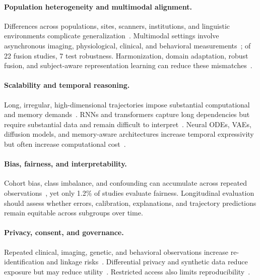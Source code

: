 \documentclass[11pt]{article}
\theoremstyle{plain}
\theoremstyle{definition}
\theoremstyle{remark}
\begin{document}
\paragraph{Population heterogeneity and multimodal alignment.} Differences across populations, sites, scanners, institutions, and linguistic environments complicate generalization~\cite{10483639,10635830,tsakalidis-etal-2022-identifying,matero-etal-2024-using}. Multimodal settings involve asynchronous imaging, physiological, clinical, and behavioral measurements~\cite{10337299,9874547,9313310,10809027,10822368,10821737}; of 22 fusion studies, 7 test robustness. Harmonization, domain adaptation, robust fusion, and subject-aware representation learning can reduce these mismatches~\cite{10385940,10890535,9711166,tseriotou-etal-2024-sig,serra-etal-2023-controllable}.
\paragraph{Scalability and temporal reasoning.} Long, irregular, high-dimensional trajectories impose substantial computational and memory demands~\cite{tsakalidis-etal-2022-identifying,hills-etal-2023-creation}. RNNs and transformers capture long dependencies but require substantial data and remain difficult to interpret~\cite{8834556,8857827,10483639}. Neural ODEs, VAEs, diffusion models, and memory-aware architectures increase temporal expressivity but often increase computational cost~\cite{9761588,10635519,10635663,9669504,8885357,9983643,8730775}.
\paragraph{Bias, fairness, and interpretability.} Cohort bias, class imbalance, and confounding can accumulate across repeated observations~\cite{10483639,10340079,9629798,9313227}, yet only 1.2\% of studies evaluate fairness. Longitudinal evaluation should assess whether errors, calibration, explanations, and trajectory predictions remain equitable across subgroups over time.
\paragraph{Privacy, consent, and governance.} Repeated clinical, imaging, genetic, and behavioral observations increase re-identification and linkage risks~\cite{8914586,9623284}. Differential privacy and synthetic data reduce exposure but may reduce utility~\cite{9474660,10821737}. Restricted access also limits reproducibility~\cite{9629798,10494110,10507968,8730775}.
\end{document}
